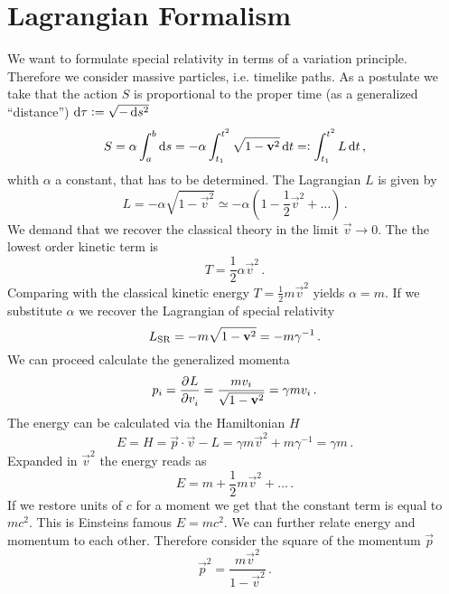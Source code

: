 \section{Lagrangian Formalism}
We want to formulate special relativity in terms of a variation principle.
Therefore we consider massive particles, i.e. timelike paths. As a postulate we
take that the action $S$ is proportional to the proper time (as a generalized
``distance'') $\dif \tau:=\sqrt{-\dif s^2}$
\begin{equation}
    S= \alpha \int_a^b\dif s = -\alpha
    \int_{t_1}^{t^2}\sqrt{1-\vec{v}^2}\dif t =: \int_{t_1}^{t^2}L\dif t\, ,
\end{equation}
whith $\alpha$ a constant, that has to be determined. The Lagrangian $L$ is
given by
\begin{equation}
    L=-\alpha\sqrt{1-\vec{v}^2}\simeq
    -\alpha\left(1-\frac{1}{2}\vec{v}^2+\ldots\right) \, .
\end{equation}
We demand that we recover the classical theory in the limit $\vec{v}\to 0$. The
the lowest order kinetic term is
\begin{equation}
    T=\frac{1}{2}\alpha \vec{v}^2\, .
\end{equation}
Comparing with the classical kinetic energy $T=\frac{1}{2}m\vec{v}^2$ yields
$\alpha=m$. If we substitute $\alpha$ we recover the Lagrangian of special
relativity
\begin{equation}
    L\textsubscript{SR}=-m\sqrt{1-\vec{v}^2}=-m\gamma^{-1}\, .
\end{equation}
We can proceed calculate the generalized momenta
\begin{equation}
    p_i=\dpd{L}{v_i}=\frac{mv_i}{\sqrt{1-\vec{v}^2}}=\gamma m v_i\, .
\end{equation}
The energy can be calculated via the Hamiltonian $H$
\begin{equation}
    E=H=\vec{p}\cdot\vec{v}-L=\gamma m \vec{v}^2 + m\gamma^{-1} =\gamma m\, .
\end{equation}
Expanded in $\vec{v}^2$ the energy reads as
\begin{equation}
    E=m+\frac{1}{2}m\vec{v}^2+\ldots\, .
\end{equation}
If we restore units of $c$ for a moment we get that the constant term is
equal to $mc^2$. This is Einsteins famous $E=mc^2$.
We can further relate energy and momentum to each other. Therefore consider the
square of the momentum $\vec{p}$
\begin{equation}
    \vec{p}^2=\frac{m\vec{v}^2}{1-\vec{v}^2}\, .
\end{equation}
